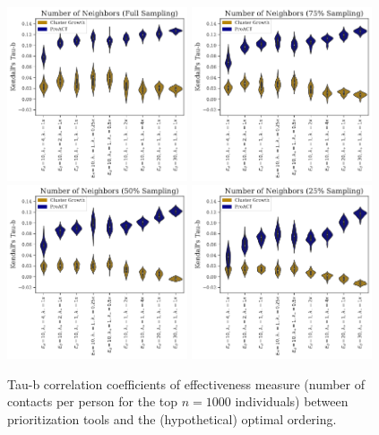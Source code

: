 \documentclass[a4paper,11pt]{article}
\begin{document}
\clearpage

\begin{figure}[!h]
\centering
\includegraphics[width=0.475\textwidth]{figs/results_efficacy_tau_contacts.pdf}
\includegraphics[width=0.475\textwidth]{figs/results_efficacy_tau_contacts_sub75.pdf}\\
\includegraphics[width=0.475\textwidth]{figs/results_efficacy_tau_contacts_sub50.pdf}
\includegraphics[width=0.475\textwidth]{figs/results_efficacy_tau_contacts_sub25.pdf}\\
\caption{{Tau-b correlation coefficients of effectiveness measure (number of contacts per person for the top $n=1000$ individuals) between prioritization tools and the (hypothetical) optimal ordering.}}\label{fig:tau-b-values-contacts}
\end{figure}
\end{document}
